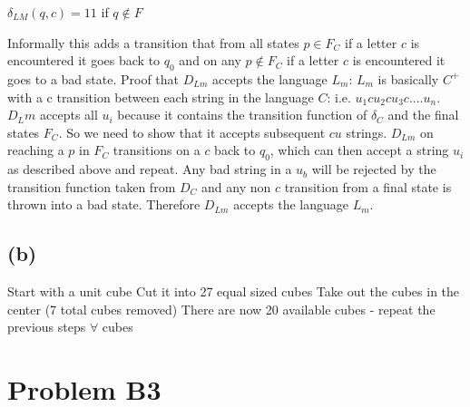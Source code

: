 \documentclass[12pt]{article}
\begin{document}
\begin{center}$\delta_{LM}(q, c) = 11 $ if $q \notin F$\end{center}
Informally this adds a transition that from all states $p \in F_C$ if a letter $c$ is encountered it goes back to $q_0$ and on any $p \notin F_C$ if a letter $c$ is encountered it goes to a bad state.\newline\newline
Proof that $D_{Lm}$ accepts the language $L_m$:\newline
\indent$L_m$ is basically $C^+$ with a c transition between each string in the language $C$: i.e. $u_1cu_2cu_3c....u_n$. $D_Lm$ accepts all $u_i$ because it contains the transition function of $\delta_C$ and the final states $F_C$.  So we need to show that it accepts subsequent $cu$ strings.  $D_{Lm}$ on reaching a $p$ in $F_C$ transitions on a $c$ back to $q_0$, which can then accept a string $u_i$ as described above and repeat.  Any bad string in a $u_b$ will be rejected by the transition function taken from $D_C$ and any non $c$ transition from a final state is thrown into a bad state.  Therefore $D_{Lm}$ accepts the language $L_m$. 
\subsection*{(b)}
Start with a unit cube\newline
Cut it into 27 equal sized cubes\newline
Take out the cubes in the center (7 total cubes removed)\newline
There are now 20 available cubes - repeat the previous steps $\forall$ cubes

\section*{Problem B3}
\end{document}
